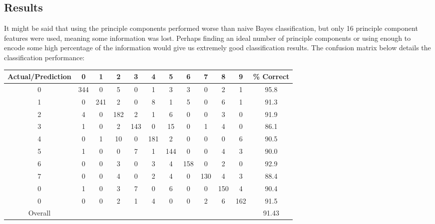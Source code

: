 \documentclass{article}
\begin{document}
\subsection{Results}
It might be said that using the principle components performed worse than naive Bayes classification, but only 16 principle component features were used, meaning some information was lost. Perhaps finding an ideal number of principle components or using enough to encode some high percentage of the information would give us extremely good classification results. The confusion matrix below details the classification performance:

\begin{tabular}{| c || c | c | c | c | c | c | c | c | c | c | c |}
  \hline
  Actual/Prediction &   0 &   1 &   2 &   3 &   4 &   5 &   6 &   7 &   8 &   9 &\% Correct \\
  \hline
  \hline
  0                 & 344 &   0 &   5 &   0 &   1 &   3 &   3 &   0 &   2 &   1 & 95.8 \\
  \hline
  1                 &   0 & 241 &   2 &   0 &   8 &   1 &   5 &   0 &   6 &   1 & 91.3 \\
  \hline
  2                 &   4 &   0 & 182 &   2 &   1 &   6 &   0 &   0 &   3 &   0 & 91.9 \\
  \hline
  3                 &   1 &   0 &   2 & 143 &   0 &  15 &   0 &   1 &   4 &   0 & 86.1 \\
  \hline
  4                 &   0 &   1 &  10 &   0 & 181 &   2 &   0 &   0 &   0 &   6 & 90.5 \\
  \hline
  5                 &   1 &   0 &   0 &   7 &   1 & 144 &   0 &   0 &   4 &   3 & 90.0 \\
  \hline
  6                 &   0 &   0 &   3 &   0 &   3 &   4 & 158 &   0 &   2 &   0 & 92.9 \\
  \hline
  7                 &   0 &   0 &   4 &   0 &   2 &   4 &   0 & 130 &   4 &   3 & 88.4 \\
  \hline
  0                 &   1 &   0 &   3 &   7 &   0 &   6 &   0 &   0 & 150 &   4 & 90.4 \\
  \hline
  0                 &   0 &   0 &   2 &   1 &   4 &   0 &   0 &   2 &   6 & 162 & 91.5 \\
  \hline
  \hline
  Overall           & & & & & & & & & &                                         & 91.43 \\
  \hline
\end{tabular}
\end{document}
